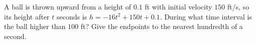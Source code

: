 A ball is thrown upward from a height of $0.1$ ft with initial velocity $150$ ft/s, so its height after $t$ seconds is $h=-16t^2+150t+0.1$. During what time interval is the ball higher than $100$ ft? Give the endpoints to the nearest hundredth of a second.
